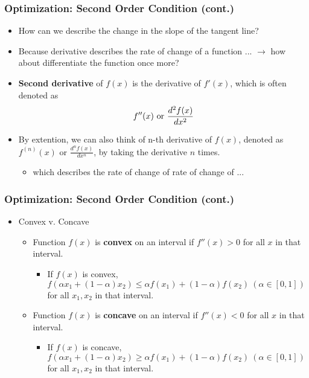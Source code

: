 \documentclass[pdflatex, 12pt]{beamer}
\begin{document}
\begin{frame}
\frametitle{Optimization: Second Order Condition (cont.)}
\begin{itemize}
\item How can we describe the change in the slope of the tangent line?
\vspace{0.4cm}
\item Because derivative describes the rate of change of a function ... $\rightarrow$ how about differentiate the function once more?
\vspace{0.4cm}
\item \textbf{Second derivative} of $f(x)$ is the derivative of $f'(x)$, which is often denoted as 
 \begin{equation}
 f''(x)\ \mathrm{or} \ \frac{d^2 f(x)}{dx^2} \notag 
 \end{equation}
\vspace{0.2cm}
\item By extention, we can also think of n-th derivative of $f(x)$, denoted as $f^{(n)} (x)$ or $\frac{d^n f(x)}{dx^n}$, by taking the derivative $n$ times.
 \begin{itemize}
 \item which describes the rate of change of rate of change of ...
 \end{itemize} 
\end{itemize}
\end{frame}

\begin{frame}
\frametitle{Optimization: Second Order Condition (cont.)}
\begin{itemize}
\item Convex v. Concave
 \begin{itemize}
 \item Function $f(x)$ is \textbf{convex} on an interval if $f''(x) > 0$ for all $x$ in that interval.
  \begin{itemize}
  \item If $f(x)$ is convex, $f(\alpha x_1 + (1 - \alpha) x_2) \leq \alpha f(x_1) + (1 - \alpha)f(x_2) \ (\alpha \in [0, 1])$ for all $x_1, x_2$ in that interval.
  \end{itemize}
 \item Function $f(x)$ is \textbf{concave} on an interval if $f''(x) < 0$ for all $x$ in that interval.
  \begin{itemize}
  \item If $f(x)$ is concave, $f(\alpha x_1 + (1 - \alpha) x_2) \geq \alpha f(x_1) + (1 - \alpha)f(x_2) \ (\alpha \in [0, 1])$ for all $x_1, x_2$ in that interval.
  \end{itemize}
 \end{itemize}
\end{itemize}
\end{frame}
\end{document}
